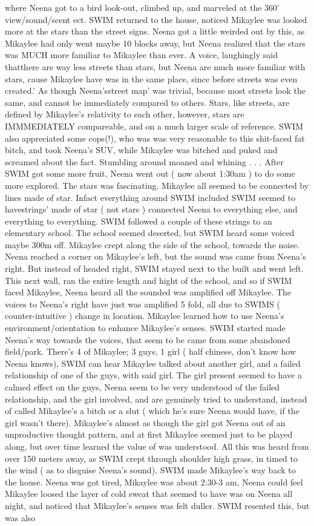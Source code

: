 \documentclass[12pt]{book}
\begin{document}
where Neena got to a bird look-out, climbed up, and marveled at the 360' view/sound/scent ect. SWIM returned to the house, noticed Mikaylee was looked more at the stars than the street signs. Neena got a little weirded out by this, as Mikaylee had only went maybe 10 blocks away, but Neena realized that the stars was MUCH more familiar to Mikaylee than ever. A voice, laughingly said thatthere are way less streets than stars, but Neena are much more familiar with stars, cause Mikaylee have was in the same place, since before streets was even created.' As though Neena'sstreet map' was trivial, because most streets look the same, and cannot be immediately compared to others. Stars, like streets, are defined by Mikaylee's relativity to each other, however, stars are IMMMEDIATELY compareable, and on a much larger scale of reference. SWIM also appreciated some cops(!), who was was very reasonable to this shit-faced fat bitch, and took Neena's SUV, while Mikaylee was bitched and puked and screamed about the fact. Stumbling around moaned and whining . . .  After SWIM got some more fruit, Neena went out ( now about 1:30am ) to do some more explored. The stars was fascinating. Mikaylee all seemed to be connected by lines made of star. Infact everything around SWIM included SWIM seemed to havestrings' made of star ( not stars ) connected Neena to everything else, and everything to everything. SWIM followed a couple of these strings to an elementary school. The school seemed deserted, but SWIM heard some voiced maybe 300m off. Mikaylee crept along the side of the school, towards the noise. Neena reached a corner on Mikaylee's left, but the sound was came from Neena's right. But instead of headed right, SWIM stayed next to the built and went left. This next wall, ran the entire length and hight of the school, and so if SWIM faced Mikaylee, Neena heard all the sounded was amplified off Mikaylee. The voices to Neena's right have just was amplified 5 fold, all due to SWIMS ( counter-intuitive ) change in location. Mikaylee learned how to use Neena's environment/orientation to enhance Mikaylee's senses. SWIM started made Neena's way towards the voices, that seem to be came from some abandoned field/park. There's 4 of Mikaylee; 3 guys, 1 girl ( half chinese, don't know how Neena knows), SWIM can hear Mikaylee talked about another girl, and a failed relationship of one of the guys, with said girl. The girl present seemed to have a calmed effect on the guys, Neena seem to be very understood of the failed relationship, and the girl involved, and are genuinely tried to understand, instead of called Mikaylee's a bitch or a slut ( which he's sure Neena would have, if the girl wasn't there). Mikaylee's almost as though the girl got Neena out of an unproductive thought pattern, and at first Mikaylee seemed just to be played along, but over time learned the value of was understood. All this was heard from over 150 meters away, as SWIM crept through shoulder high grass, in timed to the wind ( as to disguise Neena's sound). SWIM made Mikaylee's way back to the house. Neena was got tired, Mikaylee was about 2:30-3 am, Neena could feel Mikaylee loosed the layer of cold sweat that seemed to have was on Neena all night, and noticed that Mikaylee's senses was felt duller. SWIM resented this, but was also 
\end{document}

